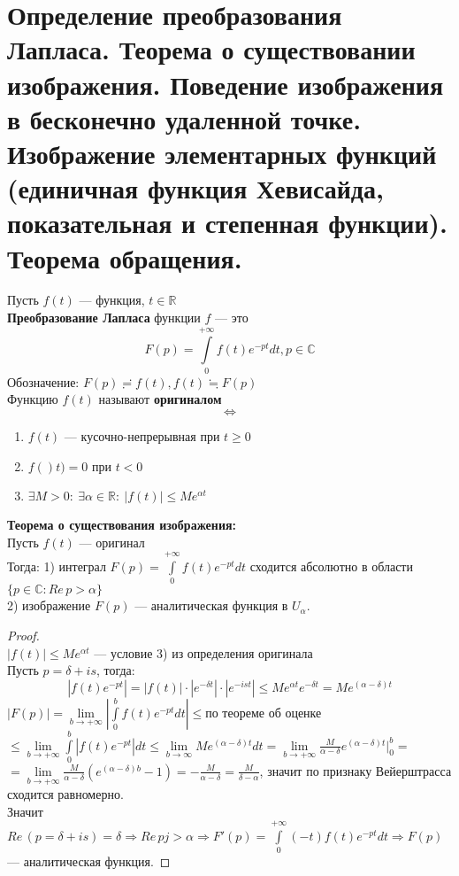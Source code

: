 \newpage
\section{Определение преобразования Лапласа. Теорема о существовании изображения. Поведение изображения в бесконечно удаленной точке. Изображение элементарных функций (единичная функция Хевисайда, показательная и степенная функции). Теорема обращения.}


Пусть $f(t)$ --- функция, $t \in \mathbb{R}$\\
\textbf{Преобразование Лапласа} функции $f$ --- это $$F(p)=\int\limits_{0}^{+\infty}f(t)e^{-pt}dt, p \in \mathbb{C}$$
Обозначение: $F(p)\risingdotseq f(t), f(t)\fallingdotseq F(p)$\\[2mm]
Функцию $f(t)$ называют \textbf{оригиналом}
$$\Leftrightarrow$$
\begin{enumerate}
    \item $f(t)$ --- кусочно-непрерывная при $t\geq 0$
    \item $f()t)=0$ при $t<0$
    \item $\exists M > 0: \ \exists \alpha \in \mathbb{R}: \ |f(t)|\leq M e^{\alpha t}$
\end{enumerate}


\textbf{Теорема о существования изображения:}\\[2mm]
Пусть $f(t)$ --- оригинал\\
Тогда: 1) интеграл $F(p)=\int\limits_{0}^{+\infty} f(t)e^{-pt}dt$ сходится абсолютно в области $\{p\in\mathbb{C}: Re\,p>\alpha\}$\\
2) изображение $F(p)$ --- аналитическая функция в $U_{\alpha}$.

\begin{proof}
    \ \\
    $|f(t)|\leq M e^{\alpha t}$ --- условие 3) из определения оригинала\\
    Пусть $p=\delta +i s$, тогда:
    $$|f(t)e^{-pt}|=|f(t)|\cdot|e^{-\delta t}|\cdot |e^{-ist}|\leq M e^{\alpha t}e^{-\delta t}=Me^{(\alpha-\delta)t}$$
    $|F(p)|=\lim\limits_{b\to + \infty} \left| \int\limits_{0}^{b}f(t)e^{-pt}dt \right| \leq \text{по теореме об оценке}$\\
    $\leq \lim\limits_{b\to +\infty}\int\limits_{0}^{b}|f(t)e^{-pt}|dt \leq \lim\limits_{b\to \infty}Me^{(\alpha-\delta)t}dt = \lim\limits_{b\to +\infty}\frac{M}{\alpha-\delta}e^{(\alpha -\delta)t}|_0^b=$\\
    $=\lim\limits_{b\to +\infty}\frac{M}{\alpha-\delta}(e^{(\alpha-\delta)b}-1)=-\frac{M}{\alpha-\delta}=\frac{M}{\delta-\alpha}$, значит по признаку Вейерштрасса сходится равномерно.\\
    Значит $Re\,(p=\delta+i s)=\delta \Rightarrow Re \, pj>\alpha \Rightarrow F'(p)=\int\limits_0^{+\infty} (-t)f(t)e^{-pt}dt \Rightarrow F(p)$ --- аналитическая функция.  
\end{proof}


